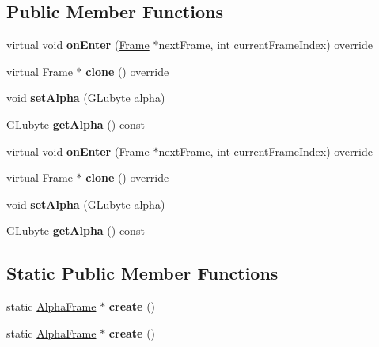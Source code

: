 \subsection*{Public Member Functions}
\begin{DoxyCompactItemize}
\item 
\mbox{\label{classAlphaFrame_a7991e1c60c60be4154f2db435e751c48}} 
virtual void {\bfseries on\+Enter} (\hyperlink{classFrame}{Frame} $\ast$next\+Frame, int current\+Frame\+Index) override
\item 
\mbox{\label{classAlphaFrame_aad3a69649876e3b312e08db830cd3ff9}} 
virtual \hyperlink{classFrame}{Frame} $\ast$ {\bfseries clone} () override
\item 
\mbox{\label{classAlphaFrame_a5b641fbf4441e2129d2a4fb68abcd8eb}} 
void {\bfseries set\+Alpha} (G\+Lubyte alpha)
\item 
\mbox{\label{classAlphaFrame_a1d9779806c690a6af1bd8ef8c5dd6c73}} 
G\+Lubyte {\bfseries get\+Alpha} () const
\item 
\mbox{\label{classAlphaFrame_a363c8759be072c803c188033ab9619d5}} 
virtual void {\bfseries on\+Enter} (\hyperlink{classFrame}{Frame} $\ast$next\+Frame, int current\+Frame\+Index) override
\item 
\mbox{\label{classAlphaFrame_a174022b8868ab49f64029a708e99240d}} 
virtual \hyperlink{classFrame}{Frame} $\ast$ {\bfseries clone} () override
\item 
\mbox{\label{classAlphaFrame_a5b641fbf4441e2129d2a4fb68abcd8eb}} 
void {\bfseries set\+Alpha} (G\+Lubyte alpha)
\item 
\mbox{\label{classAlphaFrame_a1d9779806c690a6af1bd8ef8c5dd6c73}} 
G\+Lubyte {\bfseries get\+Alpha} () const
\end{DoxyCompactItemize}
\subsection*{Static Public Member Functions}
\begin{DoxyCompactItemize}
\item 
\mbox{\label{classAlphaFrame_ac9a475a1d843c8571713704b345e87b6}} 
static \hyperlink{classAlphaFrame}{Alpha\+Frame} $\ast$ {\bfseries create} ()
\item 
\mbox{\label{classAlphaFrame_ace4448f08a5578c0c396e04e2d03941e}} 
static \hyperlink{classAlphaFrame}{Alpha\+Frame} $\ast$ {\bfseries create} ()
\end{DoxyCompactItemize}
